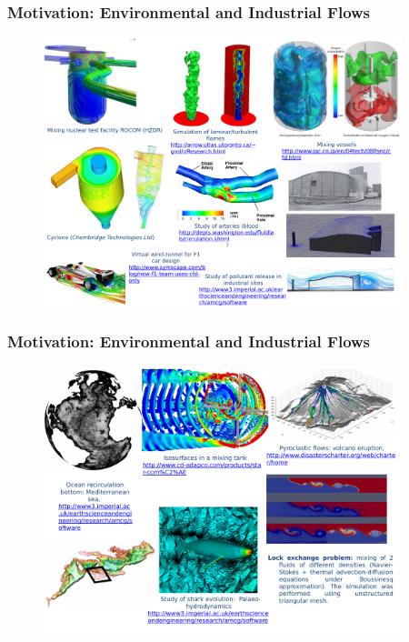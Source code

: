\documentclass[10pt,compress]{beamer}
\begin{document}
\begin{frame}
 \frametitle{Motivation: Environmental and Industrial Flows}

   \begin{figure}%
    \begin{center}
     \includegraphics[width=12.cm, height=7.8cm, clip]{./Figs/SpecificIndustrialEnvironmentalApplication2}
    \end{center}
   \end{figure}    
\end{frame}
 
\begin{frame}
 \frametitle{Motivation: Environmental and Industrial Flows}

   \begin{figure}%
    \begin{center}
     \includegraphics[width=12.cm, height=7.8cm, clip]{./Figs/PostProcessingExamples2.pdf}
    \end{center}
   \end{figure}    
\end{frame}
\end{document}
